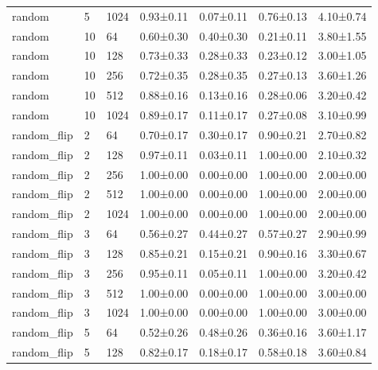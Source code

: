 \begin{tabular}{lllcccc}
random   & 5            & 1024                & 0.93±0.11  & 0.07±0.11              & 0.76±0.13 & 4.10±0.74 \\
random   & 10           & 64                  & 0.60±0.30  & 0.40±0.30              & 0.21±0.11 & 3.80±1.55 \\
random   & 10           & 128                 & 0.73±0.33  & 0.28±0.33              & 0.23±0.12 & 3.00±1.05 \\
random   & 10           & 256                 & 0.72±0.35  & 0.28±0.35              & 0.27±0.13 & 3.60±1.26 \\
random   & 10           & 512                 & 0.88±0.16  & 0.13±0.16              & 0.28±0.06 & 3.20±0.42 \\
random   & 10           & 1024                & 0.89±0.17  & 0.11±0.17              & 0.27±0.08 & 3.10±0.99 \\
\midrule
random\_flip & 2      & 64                  & 0.70±0.17  & 0.30±0.17              & 0.90±0.21 & 2.70±0.82 \\
random\_flip & 2      & 128                 & 0.97±0.11  & 0.03±0.11              & 1.00±0.00 & 2.10±0.32 \\
random\_flip & 2      & 256                 & 1.00±0.00  & 0.00±0.00              & 1.00±0.00 & 2.00±0.00 \\
random\_flip & 2      & 512                 & 1.00±0.00  & 0.00±0.00              & 1.00±0.00 & 2.00±0.00 \\
random\_flip & 2      & 1024                & 1.00±0.00  & 0.00±0.00              & 1.00±0.00 & 2.00±0.00 \\
random\_flip & 3      & 64                  & 0.56±0.27  & 0.44±0.27              & 0.57±0.27 & 2.90±0.99 \\
random\_flip & 3      & 128                 & 0.85±0.21  & 0.15±0.21              & 0.90±0.16 & 3.30±0.67 \\
random\_flip & 3      & 256                 & 0.95±0.11  & 0.05±0.11              & 1.00±0.00 & 3.20±0.42 \\
random\_flip & 3      & 512                 & 1.00±0.00  & 0.00±0.00              & 1.00±0.00 & 3.00±0.00 \\
random\_flip & 3      & 1024                & 1.00±0.00  & 0.00±0.00              & 1.00±0.00 & 3.00±0.00 \\
random\_flip & 5      & 64                  & 0.52±0.26  & 0.48±0.26              & 0.36±0.16 & 3.60±1.17 \\
random\_flip & 5      & 128                 & 0.82±0.17  & 0.18±0.17              & 0.58±0.18 & 3.60±0.84 \\

\end{tabular}
